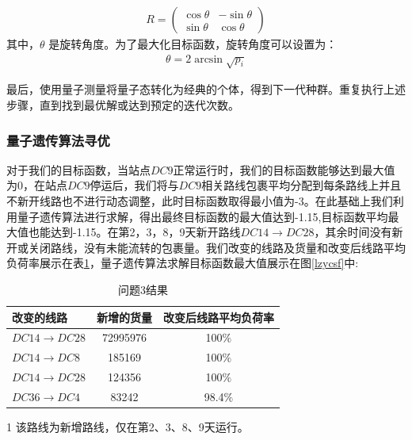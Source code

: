 \documentclass{MathorCupmodeling}
\begin{document}
\begin{eqnarray}
R=\left ( \begin{matrix}
 \cos\theta  &-\sin\theta  \\
  \sin\theta&\cos\theta 
\end{matrix} \right ) 
\end{eqnarray}
其中，$\theta$ 是旋转角度。为了最大化目标函数，旋转角度可以设置为：
\begin{eqnarray}
\theta=2\arcsin\sqrt{p_i}
\end{eqnarray}

最后，使用量子测量将量子态转化为经典的个体，得到下一代种群。重复执行上述步骤，直到找到最优解或达到预定的迭代次数。
\subsubsection{量子遗传算法寻优}
对于我们的目标函数，当站点$DC9$正常运行时，我们的目标函数能够达到最大值为0，在站点$DC9$停运后，我们将与$DC9$相关路线包裹平均分配到每条路线上并且不新开线路也不进行动态调整，此时目标函数取得最小值为-3。在此基础上我们利用量子遗传算法进行求解，得出最终目标函数的最大值达到-1.15,目标函数平均最大值也能达到-1.15。在第2，3，8，9天新开路线$DC14\to DC28$，其余时间没有新开或关闭路线，没有未能流转的包裹量。我们改变的线路及货量和改变后线路平均负荷率展示在表\ref{dc9}，量子遗传算法求解目标函数最大值展示在图\ref{lzycsf}中:
\begin{table}[!h]
    \caption{问题3结果}
\label{dc9}
    \centering
    \begin{threeparttable}          %
      \begin{tabular}{lcc}
\hline
改变的线路&	新增的货量&	改变后线路平均负荷率 \\ \hline
$DC14\to DC28$\tnote{1}&72995976&100$\%$\\
$DC14\to DC8 $   & 185169  & 100$\%$  \\
$DC14\to DC28$  & 124356   & 100$\%$ \\
$DC36\to DC4$   & 83242  & 98.4$\%$  \\\hline
\end{tabular}
         \begin{tablenotes}    %
        \footnotesize               %
        \item[1] 该路线为新增路线，仅在第2、3、8、9天运行。
      \end{tablenotes}            %
    \end{threeparttable}       %
  \end{table}
\end{document}
